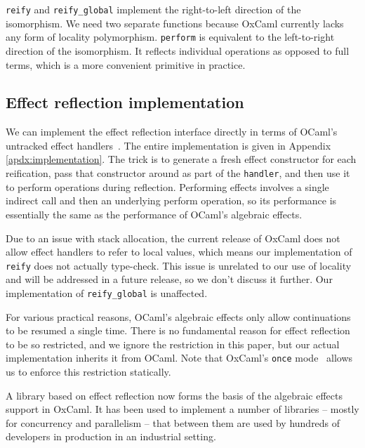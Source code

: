 \documentclass[acmsmall, screen, review, anonymous]{acmart}
\theoremstyle{definition}
\begin{document}
\lstinline[style=oxcaml]{reify} and
\lstinline[style=oxcaml]{reify_global} implement the right-to-left
direction of the isomorphism. We need two separate functions because
OxCaml currently lacks any form of locality polymorphism.
\lstinline[style=oxcaml]{perform} is equivalent to the left-to-right
direction of the isomorphism. It reflects individual operations as
opposed to full terms, which is a more convenient primitive in practice.

\subsection{Effect reflection implementation}
\label{sec:implementation}

We can implement the effect reflection interface directly in terms of
OCaml's untracked effect
handlers~\cite{Sivaramakrishnan2021retrofitting}. The entire
implementation is given in Appendix \ref{apdx:implementation}. The trick
is to generate a fresh effect constructor for each reification, pass
that constructor around as part of the
\lstinline[style=oxcaml]{handler}, and then use it to perform operations
during reflection. Performing effects involves a single indirect call
and then an underlying perform operation, so its performance is
essentially the same as the performance of OCaml's algebraic effects.

Due to an issue with stack allocation, the current release of OxCaml
does not allow effect handlers to refer to local values, which means our
implementation of \lstinline[style=oxcaml]{reify} does not actually
type-check. This issue is unrelated to our use of locality and will be
addressed in a future release, so we don't discuss it further. Our
implementation of \lstinline[style=oxcaml]{reify_global} is unaffected.

For various practical reasons, OCaml's algebraic effects only allow
continuations to be resumed a single time. There is no fundamental
reason for effect reflection to be so restricted, and we ignore the
restriction in this paper, but our actual implementation inherits it
from OCaml. Note that OxCaml's \lstinline[style=oxcaml]{once}
mode~\cite{lorenzen2024oxidizing} allows us to enforce this restriction
statically.

A library based on effect reflection now forms the basis of the
algebraic effects support in OxCaml. It has been used to implement a
number of libraries -- mostly for concurrency and parallelism -- that
between them are used by hundreds of developers in production in an
industrial setting.
\end{document}
